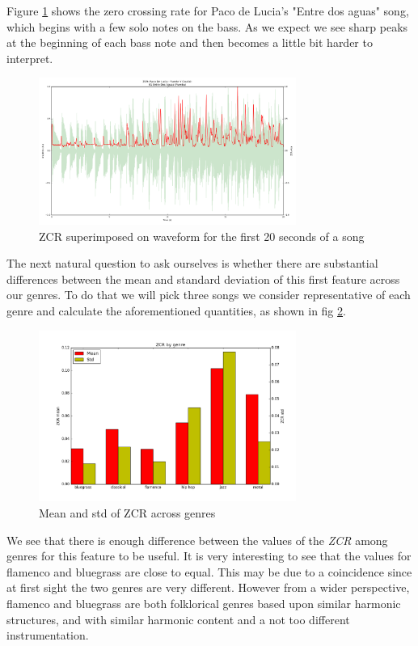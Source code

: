 \documentclass[12pt]{article}
\begin{document}
Figure \ref{zcr} shows the zero crossing rate for Paco de Lucia's "Entre dos aguas" song, which begins with a few solo notes on the bass. As we expect we see sharp peaks at the beginning of each bass note and then becomes a little bit harder to interpret. 
\medskip
\begin{figure}
\centering
  \includegraphics[width=0.75\textwidth]{ZCR_Entre_Dos_Aguas.png}
  \caption{ZCR superimposed on waveform for the first 20 seconds of a song}
  \label{zcr}
\end{figure}
\medskip

The next natural question to ask ourselves is whether there are substantial differences between the mean and standard deviation of this first feature across our genres. To do that we will pick three songs we consider representative of each genre and calculate the aforementioned quantities, as shown in fig \ref{zcr_genre}.
\begin{figure}
\centering
  \includegraphics[width=0.75\textwidth]{ZCR_by_genre.png}
  \caption{Mean and std of ZCR across genres}
  \label{zcr_genre}
\end{figure}
\medskip

We see that there is enough difference between the values of the \textit{ZCR} among genres for this feature to be useful. It is very interesting to see that the values for flamenco and bluegrass are close to equal. This may be due to a coincidence since at first sight the two genres are very different. However from a wider perspective, flamenco and bluegrass are both folklorical genres based upon similar harmonic structures, and with similar harmonic content and a not too different instrumentation.
\medskip
\end{document}
